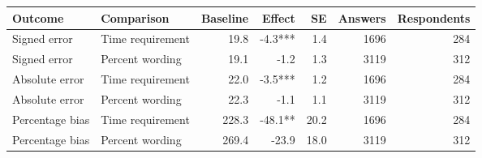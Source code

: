 
\begin{tabular}{llrrrrr}
\toprule
Outcome & Comparison & Baseline & Effect & SE & Answers & Respondents\\
\midrule
Signed error & Time requirement & 19.8 & -4.3*** & 1.4 & 1696 & 284\\
Signed error & Percent wording & 19.1 & -1.2 & 1.3 & 3119 & 312\\
Absolute error & Time requirement & 22.0 & -3.5*** & 1.2 & 1696 & 284\\
Absolute error & Percent wording & 22.3 & -1.1 & 1.1 & 3119 & 312\\
Percentage bias & Time requirement & 228.3 & -48.1** & 20.2 & 1696 & 284\\
Percentage bias & Percent wording & 269.4 & -23.9 & 18.0 & 3119 & 312\\
\bottomrule
\end{tabular}
